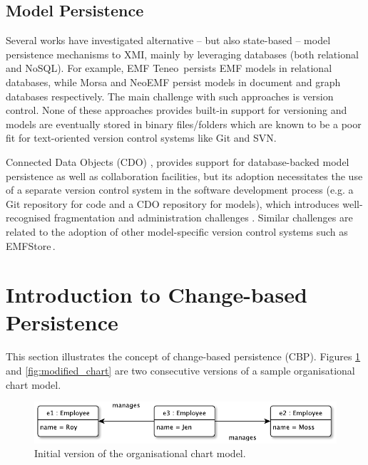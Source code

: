 \documentclass[12pt, a4paper]{report} \usepackage[titletoc]{appendix}
\begin{document}
\subsection{Model Persistence}
\label{subsec:model_persistence}
Several works have investigated alternative -- but also state-based -- model persistence mechanisms to XMI, mainly by leveraging databases (both relational and NoSQL). For example, EMF Teneo\,\cite{eclipse2017teneo} persists EMF models in relational databases, while Morsa \cite{pagan2011morsa} and NeoEMF \cite{daniel2016neoemf} persist models in document and graph databases respectively. The main challenge with such approaches is version control. None of these approaches provides built-in support for versioning and models are eventually stored in binary files/folders which are known to be a poor fit for text-oriented version control systems like Git and SVN.

Connected Data Objects (CDO) \cite{eclipse2017cdo}, provides support for database-backed model persistence as well as collaboration facilities, but its adoption necessitates the use of a separate version control system in the software development process (e.g. a Git repository for code and a CDO repository for models), which introduces well-recognised fragmentation and administration challenges \cite{barmpis2014evaluation}. Similar challenges are related to the adoption of other model-specific version control systems such as EMFStore\,\cite{koegel2010emfstore}.

\section{Introduction to Change-based Persistence}
\label{sec:introduction_to_change-based_persistence}
This section illustrates the concept of change-based persistence (CBP). Figures \ref{fig:initial_chart_0} and \ref{fig:modified_chart} are two consecutive versions of a sample organisational chart model. 

\begin{figure}[ht]
	\centering
	\includegraphics[width=\linewidth]{initial_chart_0}
	\caption{Initial version of the organisational chart model.}
	\label{fig:initial_chart_0}
\end{figure}
\end{document}
